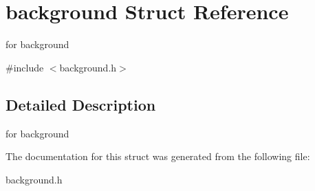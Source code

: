 \hypertarget{structbackground}{}\section{background Struct Reference}
\label{structbackground}


for background  




{\ttfamily \#include $<$background.\+h$>$}



\subsection{Detailed Description}
for background 

The documentation for this struct was generated from the following file\+:\begin{DoxyCompactItemize}
\item 
background.\+h\end{DoxyCompactItemize}
